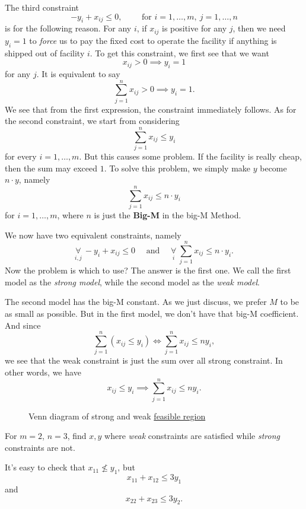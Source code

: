 \begin{note}
	The third constraint
	\[
		-y_{i} + x_{ij}\leq 0,\qquad \text{ for }i = 1, \dots , m,\ j = 1, \dots , n
	\]
	is for the following reason. For any \(i\), if \(x_{ij}\) is positive for any \(j\), then we need \(y_{i} = 1\) to \emph{force} us to pay the fixed cost to operate the facility if anything is shipped out of facility \(i\). To get this constraint, we first see that we want
	\[
		x_{ij}>0 \implies y_{i} = 1
	\]
	for any \(j\). It is equivalent to say
	\[
		\sum\limits_{j=1}^{n} x_{ij}>0 \implies y_{i} = 1.
	\]
	We see that from the first expression, the constraint immediately follows. As for the second constraint, we start from considering
	\[
		\sum\limits_{j=1}^{n} x_{ij}\leq y_{i}
	\]
	for every \(i = 1, \dots , m\). But this causes some problem. If the facility is really cheap, then the sum may exceed \(1\). To solve this problem, we simply make \(y\) become \(n\cdot y\), namely
	\[
		\sum\limits_{j=1}^{n} x_{ij}\leq n\cdot y_{i}
	\]
	for \(i = 1, \dots, m\), where \(n\) is just the \textbf{Big-M} in the big-M Method.
\end{note}

We now have two equivalent constraints, namely
\[
	\underset{i, j}{\forall }\ -y_{i} + x_{ij}\leq 0\quad  \text{ and }\quad \underset{i}{\forall }\ \sum\limits_{j=1}^{n} x_{ij}\leq n\cdot y_{i}.
\]
Now the problem is which to use? The answer is the first one. We call the first model as the \emph{strong model}, while the second model as the \emph{weak model}.

\begin{intuition}
	The second model has the big-M constant. As we just discuss, we prefer \(M\) to be as small as possible. But in the first model, we don't have that big-M coefficient. And since
	\[
		\sum\limits_{j=1}^{n} \left(x_{ij}\leq y_i\right) \iff \sum\limits_{j=1}^{n} x_{ij}\leq n y_{i},
	\]
	we see that the weak constraint is just the sum over all strong constraint. In other words, we have
	\[
		x_{ij}\leq y_i \implies \sum\limits_{j=1}^{n} x_{ij}\leq n y_{i}.
	\]
	\begin{figure}[H]
		\centering
		\caption{Venn diagram of strong and weak \hyperref[def:feasible-region]{feasible region}}
		\label{fig:strong-weak-constraint}
	\end{figure}
\end{intuition}

\begin{eg}
	For \(m = 2\), \(n = 3\), find \(x, y\) where \emph{weak} constraints are satisfied while \emph{strong} constraints are not.
	\begin{center}
	\end{center}
	It's easy to check that \(x_{11}\nleq y_1\), but
	\[
		x_{11}+x_{12} \leq 3y_1
	\]
	and
	\[
		x_{22}+x_{23}\leq 3y_2.
	\]
\end{eg}


